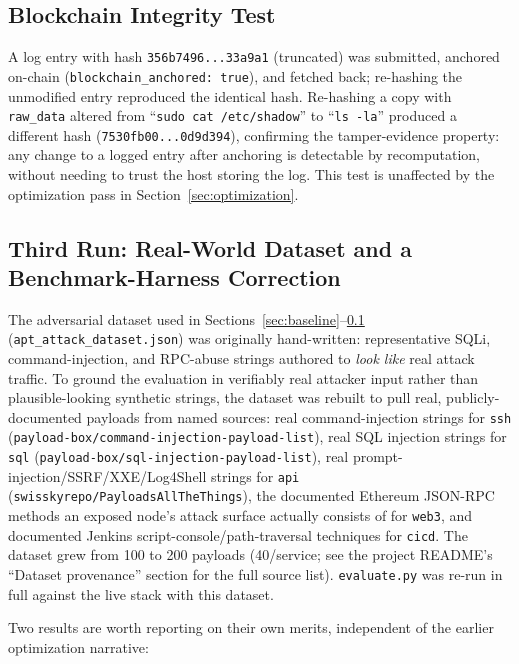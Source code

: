 \documentclass[conference]{IEEEtran}
\begin{document}
\subsection{Blockchain Integrity Test}
\label{sec:blockchaintestresults}

A log entry with hash \texttt{356b7496...33a9a1} (truncated) was
submitted, anchored on-chain (\texttt{blockchain\_anchored: true}), and
fetched back; re-hashing the unmodified entry reproduced the identical
hash. Re-hashing a copy with \texttt{raw\_data} altered from
``\texttt{sudo cat /etc/shadow}'' to ``\texttt{ls -la}'' produced a
different hash (\texttt{7530fb00...0d9d394}), confirming the
tamper-evidence property: any change to a logged entry after anchoring is
detectable by recomputation, without needing to trust the host storing the
log. This test is unaffected by the optimization pass in
Section~\ref{sec:optimization}.

\subsection{Third Run: Real-World Dataset and a Benchmark-Harness Correction}
\label{sec:realworldrun}

The adversarial dataset used in
Sections~\ref{sec:baseline}--\ref{sec:blockchaintestresults}
(\texttt{apt\_attack\_dataset.json}) was originally hand-written:
representative SQLi, command-injection, and RPC-abuse strings authored to
\emph{look like} real attack traffic. To ground the evaluation in verifiably
real attacker input rather than plausible-looking synthetic strings, the
dataset was rebuilt to pull real, publicly-documented payloads from named
sources: real command-injection strings for \texttt{ssh}
(\texttt{payload-box/command-injection-payload-list}), real SQL injection
strings for \texttt{sql} (\texttt{payload-box/sql-injection-payload-list}),
real prompt-injection/SSRF/XXE/Log4Shell strings for \texttt{api}
(\texttt{swisskyrepo/PayloadsAllTheThings}), the documented Ethereum
JSON-RPC methods an exposed node's attack surface actually consists of for
\texttt{web3}, and documented Jenkins script-console/path-traversal
techniques for \texttt{cicd}. The dataset grew from 100 to 200 payloads
(40/service; see the project README's ``Dataset provenance'' section for
the full source list). \texttt{evaluate.py} was re-run in full against the
live stack with this dataset.

Two results are worth reporting on their own merits, independent of the
earlier optimization narrative:
\end{document}
